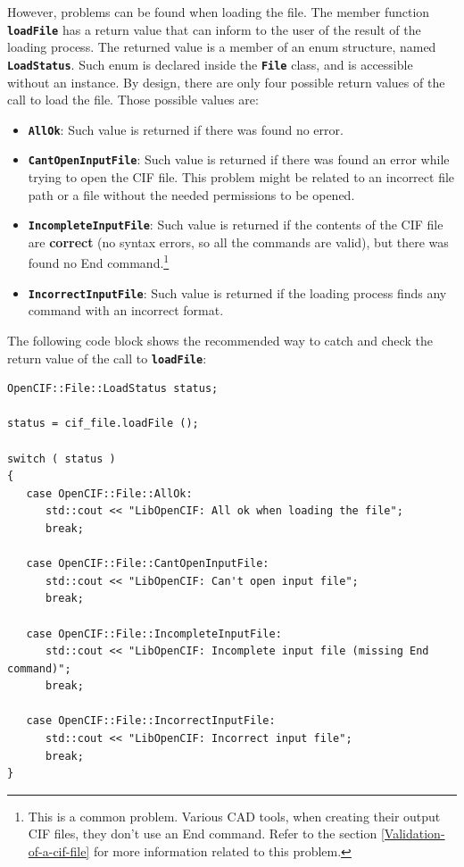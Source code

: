 \documentclass[11pt,twoside,openany,x11names,svgnames]{memoir}
\begin{document}
However, problems can be found when loading the file. The member function \textbf{\texttt{loadFile}} has a return value that can inform to the user of the result of the loading process. The returned value is a member of an enum structure, named \textbf{\texttt{LoadStatus}}. Such enum is declared inside the \textbf{\texttt{File}} class, and is accessible without an instance. By design, there are only four possible return values of the call to load the file. Those possible values are:

\begin{itemize}
	\item \textbf{\texttt{AllOk}}: Such value is returned if there was found no error.
	
	\item \textbf{\texttt{CantOpenInputFile}}: Such value is returned if there was found an error while trying to open the CIF file. This problem might be related to an incorrect file path or a file without the needed permissions to be opened.
	
	\item \textbf{\texttt{IncompleteInputFile}}: Such value is returned if the contents of the CIF file are \textbf{correct} (no syntax errors, so all the commands are valid), but there was found no End command.\footnote{This is a common problem. Various CAD tools, when creating their output CIF files, they don't use an End command. Refer to the section \ref{Validation-of-a-cif-file} for more information related to this problem.}
	
	\item \textbf{\texttt{IncorrectInputFile}}: Such value is returned if the loading process finds any command with an incorrect format.
\end{itemize}

The following code block shows the recommended way to catch and check the return value of the call to \textbf{\texttt{loadFile}}:

\begin{lstlisting}[frame=single,style=CPPStyle]
OpenCIF::File::LoadStatus status;
   
status = cif_file.loadFile ();
   
switch ( status )
{
   case OpenCIF::File::AllOk:
      std::cout << "LibOpenCIF: All ok when loading the file";
      break;
         
   case OpenCIF::File::CantOpenInputFile:
      std::cout << "LibOpenCIF: Can't open input file";
      break;
         
   case OpenCIF::File::IncompleteInputFile:
      std::cout << "LibOpenCIF: Incomplete input file (missing End command)";
      break;
         
   case OpenCIF::File::IncorrectInputFile:
      std::cout << "LibOpenCIF: Incorrect input file";
      break;
}
\end{lstlisting}
\end{document}
